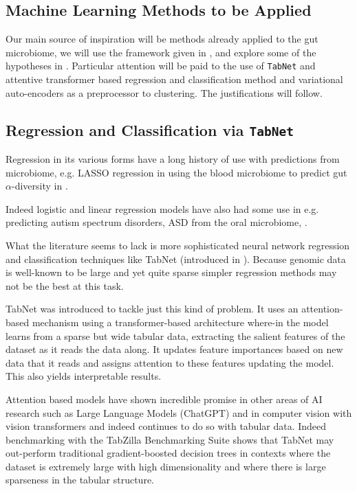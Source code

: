 \documentclass{article}
\begin{document}
\begin{multicols}{2}
\section{Machine Learning Methods to be Applied} 
Our main source of inspiration will be methods already applied to the gut microbiome, we will use the framework given in \cite{li_machine_2022}, and explore some of the hypotheses in \cite{tao_relationship_2024}. Particular attention will be paid to the use of \texttt{TabNet} and attentive transformer based regression and classification method and variational auto-encoders as a preprocessor to clustering. The justifications will follow.
\subsection{Regression and Classification via \texttt{TabNet}}
Regression in its various forms have a long history of use with predictions from microbiome, e.g. LASSO regression in using the blood microbiome to predict gut $\alpha$-diversity in \cite{wilmanski_blood_2019}. 

Indeed logistic and linear regression models have also had some use in e.g. predicting autism spectrum disorders, ASD from the oral microbiome, \cite{li_genetic_2022}. 

What the literature seems to lack is more sophisticated neural network regression and classification techniques like TabNet (introduced in \cite{arik_tabnet_2021}). Because genomic data is well-known to be large and yet quite sparse simpler regression methods may not be the best at this task. 

TabNet was introduced to tackle just this kind of problem. It uses an attention-based mechanism using a transformer-based \cite{vaswani_attention_2017} architecture where-in the model learns from a sparse but wide tabular data, extracting the salient features of the dataset as it reads the data along. It updates feature importances based on new data that it reads and assigns attention to these features updating the model. This also yields interpretable results.

Attention based models have shown incredible promise in other areas of AI research such as Large Language Models (ChatGPT) and in computer vision with vision transformers and indeed continues to do so with tabular data. Indeed benchmarking with the TabZilla Benchmarking Suite \cite{mcelfresh2023neural} shows that TabNet may out-perform traditional gradient-boosted decision trees in contexts where the dataset is extremely large with high dimensionality and where there is large sparseness in the tabular structure.


\end{multicols}
\end{document}
